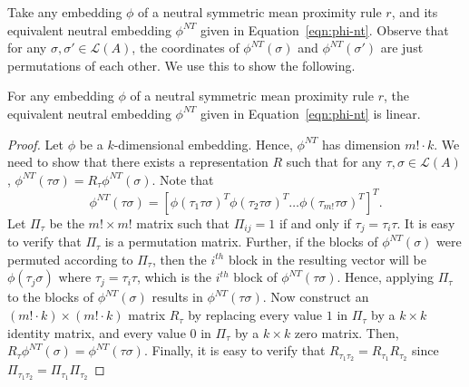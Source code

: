 \documentclass[prodmode,acmec]{ec-acmsmall}
\newcommand{\calL}{{\mathcal{L}}}
\newcommand{\rank}{{\calL(A)}}
\newcommand{\nt}{NT}
\begin{document}
Take any embedding $\phi$ of a neutral symmetric mean proximity rule $r$, and its equivalent neutral embedding $\phi^{\nt}$ given in Equation~\eqref{eqn:phi-nt}. Observe that for any $\sigma,\sigma' \in \rank$, the coordinates of $\phi^{\nt}(\sigma)$ and $\phi^{\nt}(\sigma')$ are just permutations of each other. We use this to show the following.
\begin{lemma}
For any embedding $\phi$ of a neutral symmetric mean proximity rule $r$, the equivalent neutral embedding $\phi^{\nt}$ given in Equation~\eqref{eqn:phi-nt} is linear.
\label{lem:nt-linear}
\end{lemma}
\begin{proof}
Let $\phi$ be a $k$-dimensional embedding. Hence, $\phi^{\nt}$ has dimension $m! \cdot k$. We need to show that there exists a representation $R$ such that for any $\tau,\sigma \in \rank$, $\phi^{\nt}(\tau \sigma) = R_{\tau}\phi^{\nt}(\sigma)$. Note that 
$$
\phi^{\nt}(\tau \sigma) = [\phi(\tau_1 \tau \sigma)^T \phi(\tau_2 \tau \sigma)^T \ldots \phi(\tau_{m!} \tau \sigma)^T]^T.
$$
Let $\Pi_{\tau}$ be the $m! \times m!$ matrix such that $\Pi_{ij} = 1$ if and only if $\tau_j = \tau_i \tau$. It is easy to verify that $\Pi_{\tau}$ is a permutation matrix. Further, if the blocks of $\phi^{\nt}(\sigma)$ were permuted according to $\Pi_{\tau}$, then the $i^{th}$ block in the resulting vector will be $\phi(\tau_j \sigma)$ where $\tau_j = \tau_i \tau$, which is the $i^{th}$ block of $\phi^{\nt}(\tau \sigma)$. Hence, applying $\Pi_{\tau}$ to the blocks of $\phi^{\nt}(\sigma)$ results in $\phi^{\nt}(\tau \sigma)$. Now construct an $(m! \cdot k) \times (m! \cdot k)$ matrix $R_{\tau}$ by replacing every value $1$ in $\Pi_{\tau}$ by a $k\times k$ identity matrix, and every value $0$ in $\Pi_{\tau}$ by a $k\times k$ zero matrix. Then, $R_{\tau} \phi^{\nt}(\sigma) = \phi^{\nt}(\tau \sigma)$. Finally, it is easy to verify that $R_{\tau_1 \tau_2} = R_{\tau_1} R_{\tau_2}$ since $\Pi_{\tau_1 \tau_2} = \Pi_{\tau_1} \Pi_{\tau_2}$
\end{proof}
\end{document}
